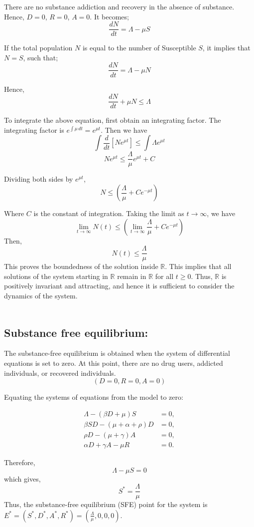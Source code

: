 \documentclass[12pt]{report}
\begin{document}
There are no substance addiction and recovery in the absence of substance. Hence, $D = 0$, $R = 0$, $A = 0$. It becomes;
\[ \frac{dN}{dt} = \Lambda - \mu S \]

If the total population $N$ is equal to the number of Susceptible $S$, it implies that $N = S$, such that;
\[ \frac{dN}{dt} = \Lambda - \mu N \]

Hence,
\[ \frac{dN}{dt} + \mu N \leq \Lambda \]

To integrate the above equation, first obtain an integrating factor.
The integrating factor is $e^{\int \mu \, dt} = e^{\mu t}$. Then we have
\[ \int \frac{d}{dt} [Ne^{\mu t}] \leq \int \Lambda e^{\mu t} \]
\[ Ne^{\mu t} \leq \frac{\Lambda}{\mu} e^{\mu t} + C \]

Dividing both sides by $e^{\mu t}$,
\[ N \leq \left( \frac{\Lambda}{\mu} + C e^{-\mu t} \right) \]

Where $C$ is the constant of integration. Taking the limit as $t \to \infty$, we have
\[ \lim_{t \to \infty} N(t) \leq \left( \lim_{t \to \infty} \frac{\Lambda}{\mu} + C e^{-\mu t} \right) \]
Then,
\[ N(t) \leq \frac{\Lambda}{\mu} \]
This proves the boundedness of the solution inside $\mathbb{R}$. This implies that all solutions of the system starting in $\mathbb{R}$ remain in $\mathbb{R}$ for all $t \geq 0$. Thus, $\mathbb{R}$ is positively invariant and attracting, and hence it is sufficient to consider the dynamics of the system.\\\\
\subsection{Substance free equilibrium:}
The substance-free equilibrium is obtained when the system of differential equations is set to zero. At this point, there are no drug users, addicted individuals, or recovered individuals.
\[ (D = 0, R = 0, A = 0) \]

Equating the systems of equations from the model to zero:
\begin{center}


\[
\begin{aligned}
	\Lambda - (\beta D + \mu)S &= 0, \\
	\beta SD - (\mu + \alpha + \rho)D &= 0, \\
	\rho D - (\mu + \gamma)A &= 0, \\
	\alpha D + \gamma A - \mu R &= 0.
\end{aligned}
\]
\end{center}
Therefore,
\[ \Lambda - \mu S = 0 \]
which gives,
\[ S^* = \frac{\Lambda}{\mu} \]
Thus, the substance-free equilibrium (SFE) point for the system is \( E^* = (S^*, D^*, A^*, R^*) = \left( \frac{\Lambda}{\mu}, 0, 0, 0 \right) \).\\\\
\end{document}
